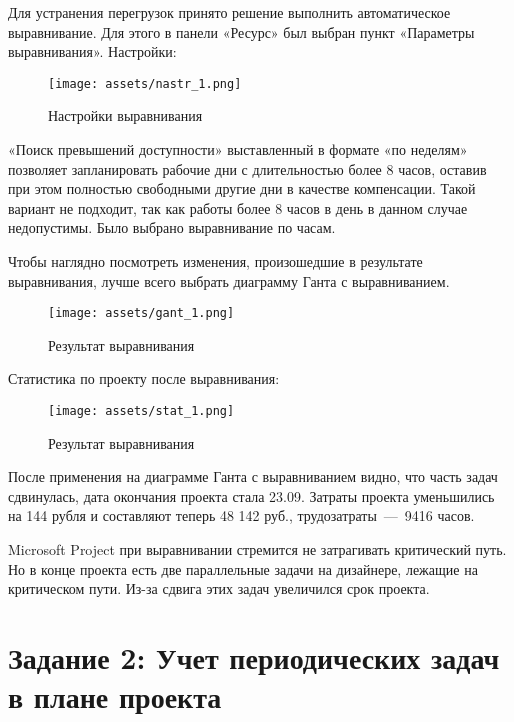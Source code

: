 Для устранения перегрузок принято решение выполнить автоматическое выравнивание. Для этого в панели «Ресурс» был выбран пункт «Параметры выравнивания». Настройки:

\begin{figure}[H]
    \begin{center}
    \texttt{[image: assets/nastr\_1.png]}
    \caption{Настройки выравнивания}
    \label{fig:2}
    \end{center}
\end{figure}

«Поиск превышений доступности» выставленный в формате «по неделям» позволяет запланировать рабочие дни с длительностью более 8 часов, оставив при этом полностью свободными другие дни в качестве компенсации. Такой вариант не подходит, так как работы более 8 часов в день в данном случае недопустимы. Было выбрано выравнивание по часам.

Чтобы наглядно посмотреть изменения, произошедшие в результате выравнивания, лучше всего выбрать диаграмму Ганта с выравниванием.

\begin{figure}[H]
    \begin{center}
    \texttt{[image: assets/gant\_1.png]}
    \caption{Результат выравнивания}
    \label{fig:2}
    \end{center}
\end{figure}

Статистика по проекту после выравнивания:

\begin{figure}[H]
    \begin{center}
    \texttt{[image: assets/stat\_1.png]}
    \caption{Результат выравнивания}
    \label{fig:2}
    \end{center}
\end{figure}

После применения на диаграмме Ганта с выравниванием видно, что часть задач сдвинулась, дата окончания проекта стала 23.09. Затраты проекта уменьшились на 144 рубля и составляют теперь 48 142 руб., трудозатраты~---~9416 часов. 

Microsoft Project при выравнивании стремится не затрагивать критический путь. Но в конце проекта есть две параллельные задачи на дизайнере, лежащие на критическом пути. Из-за сдвига этих задач увеличился срок проекта.

\section{Задание 2: Учет периодических задач в плане проекта}

